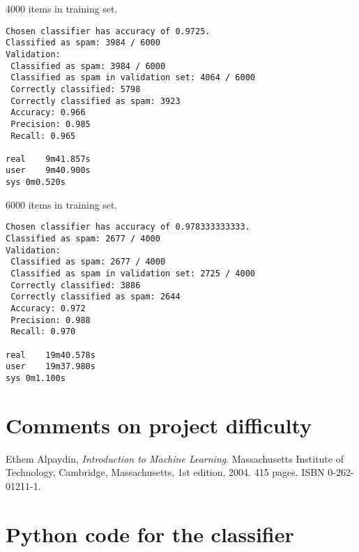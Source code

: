 \documentclass[a4paper,10pt]{article}
\begin{document}
4000 items in training set.

\begin{verbatim}
Chosen classifier has accuracy of 0.9725.
Classified as spam: 3984 / 6000
Validation:
 Classified as spam: 3984 / 6000
 Classified as spam in validation set: 4064 / 6000
 Correctly classified: 5798
 Correctly classified as spam: 3923
 Accuracy: 0.966
 Precision: 0.985
 Recall: 0.965

real	9m41.857s
user	9m40.900s
sys	0m0.520s
\end{verbatim}

6000 items in training set.

\begin{verbatim}
Chosen classifier has accuracy of 0.978333333333.
Classified as spam: 2677 / 4000
Validation:
 Classified as spam: 2677 / 4000
 Classified as spam in validation set: 2725 / 4000
 Correctly classified: 3886
 Correctly classified as spam: 2644
 Accuracy: 0.972
 Precision: 0.988
 Recall: 0.970

real	19m40.578s
user	19m37.980s
sys	0m1.100s
\end{verbatim}

\section{Comments on project difficulty}

\begin{thebibliography}{9}
  Ethem Alpaydin,
  \emph{Introduction to Machine Learning}.
  Massachusetts Institute of Technology, Cambridge, Massachusetts,
  1st edition,
  2004. 415 pages. ISBN 0-262-01211-1.
\end{thebibliography}

\appendix
\section{Python code for the classifier}

\end{document}
